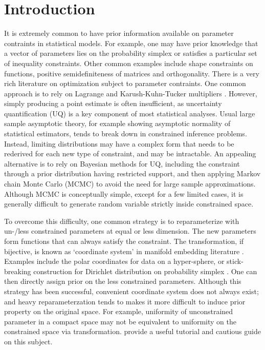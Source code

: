 \documentclass[10pt,fleqn]{article}
\DeclareMathOperator{\1}{\mathbbm{1}}
\begin{document}
\section{Introduction}
It is extremely common to have prior information available on parameter
contraints in statistical models. For example, one may have prior knowledge
that a vector of parameters lies on the probability simplex or satisfies a
particular set of inequality constraints. Other common examples include
shape constraints on functions, positive semidefiniteness of matrices and
orthogonality. There is a very rich literature on optimization subject to
parameter contraints. One common approach is to rely on Lagrange and
Karush-Kuhn-Tucker multipliers \citep{boyd2004convex}. However, simply
producing a point estimate is often insufficient, as uncertainty
quantification (UQ) is a key component of most statistical analyses. Usual
large sample asymptotic theory, for example showing asymptotic normality of
statistical estimators, tends to break down in constrained inference
problems. Instead, limiting distributions may have a complex form that
needs to be rederived for each new type of constraint, and may be
intractable. An appealing alternative is to rely on Bayesian methods for
UQ, including the constraint through a prior distribution having restricted
support, and then applying Markov chain Monte Carlo (MCMC) to avoid the
need for large sample approximations.
Although MCMC is conceptually simple, except for a few limited cases, it is generally difficult to generate random
variable strictly inside constrained space.
 
To overcome this difficulty, one common strategy  is to  reparameterize
 with un-/less constrained parameters at equal or less dimension. The new parameters form functions
that  can always
satisfy the constraint. The transformation, if bijective,  is known as `coordinate system' in manifold embedding literature \citep{nash1954c1,do2016differential}. Examples
include the polar coordinates for data on a hyper-sphere, or stick-breaking construction for Dirichlet distribution on
probability simplex \citep{ishwaran2001gibbs}.  One can then directly assign prior on the less constrained parameters.
Although this strategy has been successful, convenient coordinate system does not always exist; and heavy reparameterzation tends to makes it more
difficult to
induce prior property on the original space. For example, uniformity of unconstrained
parameter in a compact space may not be equivalent to uniformity on the constrained space via transformation. \cite{diaconis2013manifold}
provide a useful tutorial and cautious guide on this subject.
\end{document}

